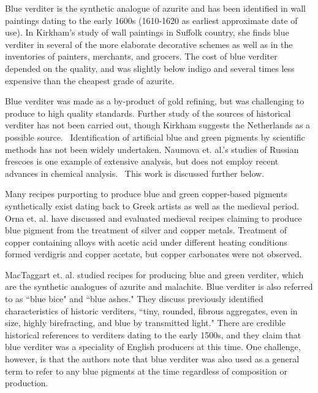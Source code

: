 Blue verditer is the synthetic analogue of azurite and has been identified in wall paintings dating to the early 1600s (1610-1620 as earliest approximate date of use). In Kirkham's study of wall paintings in Suffolk country, she finds blue verditer in several of the more elaborate decorative schemes as well as in the inventories of painters, merchants, and grocers. The cost of blue verditer depended on the quality, and was slightly below indigo and several times less expensive than the cheapest grade of azurite.~\autocite{Kirkham_thesis} 

Blue verditer was made as a by-product of gold refining, but was challenging to produce to high quality standards. Further study of the sources of historical verditer has not been carried out, though Kirkham suggests the Netherlands as a possible source.~\autocite{Kirkham_thesis,Kirby} Identification of artificial blue and green pigments by scientific methods has not been widely undertaken. Naumova et. al.'s studies of Russian frescoes is one example of extensive analysis, but does not employ recent advances in chemical analysis.~\autocite{Naumova1994,Naumova1990} This work is discussed further below.

Many recipes purporting to produce blue and green copper-based pigments synthetically exist dating back to Greek artists as well as the medieval period.~\autocite{mappae_clavicula,Orna_literature,Orna_silver,Barnett} Orna et. al. have discussed and evaluated medieval recipes claiming to produce blue pigment from the treatment of silver and copper metals. Treatment of copper containing alloys with acetic acid under different heating conditions formed verdigris and copper acetate, but copper carbonates were not observed.~\autocite{Orna_literature,Orna_silver}

MacTaggart et. al. studied recipes for producing blue and green verditer, which are the synthetic analogues of azurite and malachite. Blue verditer is also referred to as ``blue bice" and ``blue ashes." They discuss previously identified characteristics of historic verditers, ``tiny, rounded, fibrous aggregates, even in size, highly birefracting, and blue by transmitted light." There are credible historical references to verditers dating to the early 1500s, and they claim that blue verditer was a speciality of English producers at this time. One challenge, however, is that the authors note that blue verditer was also used as a general term to refer to any blue pigments at the time regardless of composition or production. 

